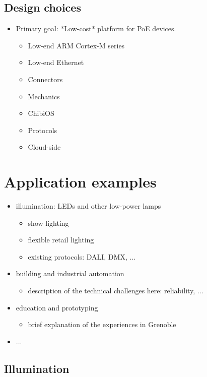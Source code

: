 \documentclass[draft,a4paper]{siamltex}
\begin{document}
\subsection{Design choices}
 
\begin{itemize}
  \item Primary goal: *Low-cost* platform for PoE devices.
    \begin{itemize}
    \item Low-end ARM Cortex-M series
    \item Low-end Ethernet
    \item Connectors
    \item Mechanics
    \item ChibiOS
    \item Protocols
    \item Cloud-side
    \end{itemize}
\end{itemize}

\section{Application examples}
\label{sec:examples}

\begin{itemize}
  \item illumination: LEDs and other low-power lamps
    \begin{itemize}
    \item show lighting
    \item flexible retail lighting
    \item existing protocols: DALI, DMX, ...
    \end{itemize}
  \item building and industrial automation
    \begin{itemize}
    \item description of the technical challenges here: reliability, ...
    \end{itemize}
  \item education and prototyping
    \begin{itemize}
    \item brief explanation of the experiences in Grenoble
    \end{itemize}
  \item ...
\end{itemize}

\subsection{Illumination}
\end{document}
